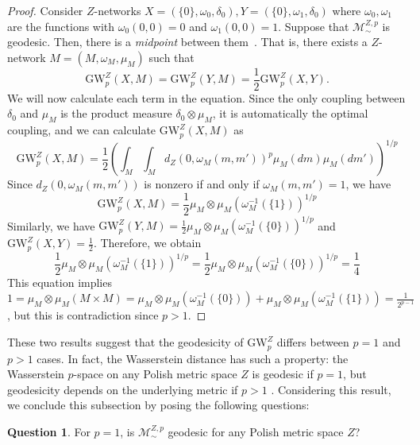 \documentclass[twoside,11pt]{article}
\theoremstyle{definition}
\newtheorem{question}[theorem]{Question}
\newcommand{\M}{\mathcal{M}}
\newcommand{\MZp}{\M_{\sim}^{Z,p}}
\newcommand{\dgwz}{\mathrm{GW}_p^Z}
\begin{document}
\begin{proof}
    Consider $Z$-networks $X=(\{0\},\omega_0, \delta_0), Y= (\{0\}, \omega_1, \delta_0)$ where $\omega_0, \omega_1$ are the functions with $\omega_0(0,0)=0$ and $\omega_1(0,0)=1$.  Suppose that $\MZp$ is geodesic. Then, there is a \emph{midpoint} between them~\citep[Lemma 2.4.8]{burago2001course}. That is, there exists a $Z$-network $M= (M,\omega_M, \mu_M)$ such that
    \begin{equation}
        \dgwz(X,M)=\dgwz(Y,M)=\frac{1}{2}\dgwz(X,Y).
    \end{equation}
We will now calculate each term in the equation. Since the only coupling between $\delta_0$ and $\mu_M$ is the product measure $\delta_0\otimes \mu_M$, it is automatically the optimal coupling, and we can calculate $\dgwz(X,M)$ as
\begin{equation}
    \dgwz(X,M) = \frac{1}{2}\left(\int_{M}\int_{M}d_Z(0,\omega_M(m,m'))^p\mu_M(dm)\mu_M(dm')\right)^{1/p}
\end{equation}
Since $d_Z(0,\omega_M(m,m'))$ is nonzero if and only if $\omega_M(m,m')=1$, we have 
\begin{equation}
    \dgwz(X,M) =\frac{1}{2} \mu_M\otimes \mu_M(\omega_M^{-1}(\{1\}))^{1/p}
\end{equation}
Similarly, we have $\dgwz(Y,M)=\frac{1}{2}\mu_M\otimes \mu_M(\omega_M^{-1}(\{0\}))^{1/p}$ and $\dgwz(X,Y)=\frac{1}{2}$. Therefore, we obtain
\begin{equation}
    \frac{1}{2}\mu_M\otimes \mu_M(\omega_M^{-1}(\{1\}))^{1/p}=\frac{1}{2}\mu_M\otimes \mu_M(\omega_M^{-1}(\{0\}))^{1/p} = \frac{1}{4}
\end{equation}
This equation implies $1=\mu_M\otimes \mu_M(M\times M) = \mu_M\otimes \mu_M(\omega_M^{-1}(\{0\})) +\mu_M\otimes \mu_M(\omega_M^{-1}(\{1\})) = \frac{1}{2^{p-1}}$, but this is contradiction since $p>1$.
\end{proof}
These two results suggest that the geodesicity of $\dgwz$ differs between $p=1$ and $p>1$ cases. In fact, the Wasserstein distance has such a property: the Wasserstein $p$-space on any Polish metric space $Z$ is geodesic if $p=1$, but geodesicity depends on the underlying metric if $p>1$ \citep[Theorem 3.16, Remark 3.18]{MEMOLI2023102006}. Considering this result, we conclude this subsection by posing the following questions:

\begin{question}\label{question:always_geodesic}
For $p=1$, is $\MZp$ geodesic for any Polish metric space $Z$?
\end{question}
\end{document}
